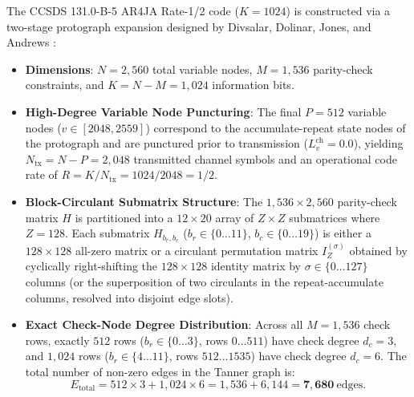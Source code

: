 \documentclass[10pt]{article}
\begin{document}
The CCSDS 131.0-B-5 AR4JA Rate-1/2 code ($K=1024$) \cite{ccsds_tm_coding} is constructed via a two-stage protograph expansion designed by Divsalar, Dolinar, Jones, and Andrews \cite{divsalar_linear_distance, andrews_deep_space_ldpc}:
\begin{itemize}[leftmargin=1.8em, itemsep=2pt]
    \item \textbf{Dimensions}: $N = 2,560$ total variable nodes, $M = 1,536$ parity-check constraints, and $K = N - M = 1,024$ information bits.
    \item \textbf{High-Degree Variable Node Puncturing}: The final $P = 512$ variable nodes ($v \in [2048, 2559]$) correspond to the accumulate-repeat state nodes of the protograph and are punctured prior to transmission ($L_v^{\mathrm{ch}} = 0.0$), yielding $N_{\mathrm{tx}} = N - P = 2,048$ transmitted channel symbols and an operational code rate of $R = K / N_{\mathrm{tx}} = 1024 / 2048 = 1/2$.
    \item \textbf{Block-Circulant Submatrix Structure}: The $1,536 \times 2,560$ parity-check matrix $H$ is partitioned into a $12 \times 20$ array of $Z \times Z$ submatrices where $Z = 128$. Each submatrix $H_{b_r, b_c}$ ($b_r \in \{0 \dots 11\}$, $b_c \in \{0 \dots 19\}$) is either a $128 \times 128$ all-zero matrix or a circulant permutation matrix $I_Z^{(\sigma)}$ obtained by cyclically right-shifting the $128 \times 128$ identity matrix by $\sigma \in \{0 \dots 127\}$ columns (or the superposition of two circulants in the repeat-accumulate columns, resolved into disjoint edge slots).
    \item \textbf{Exact Check-Node Degree Distribution}: Across all $M = 1,536$ check rows, exactly $512$ rows ($b_r \in \{0 \dots 3\}$, rows $0 \dots 511$) have check degree $d_c = 3$, and $1,024$ rows ($b_r \in \{4 \dots 11\}$, rows $512 \dots 1535$) have check degree $d_c = 6$. The total number of non-zero edges in the Tanner graph is:
    \begin{equation}
    E_{\mathrm{total}} = 512 \times 3 + 1,024 \times 6 = 1,536 + 6,144 = \mathbf{7,680\ \mathrm{edges}}.
    \end{equation}
\end{itemize}
\end{document}
